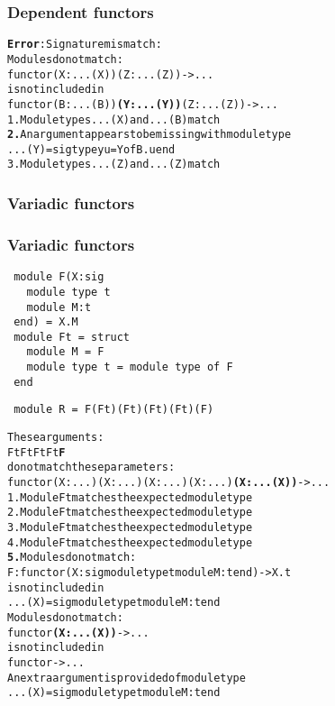 \documentclass[a4paper,11pt]{beamer}
\begin{document}
\begin{frame}[fragile]\frametitle{Dependent functors}
\begin{alltt}
{\bfseries{}\color{red}{}Error}: Signature mismatch:
       Modules do not match:
         functor {\color{green}{}(X : ...(X))} {\color{red}{}\bfseries{}} {\color{green}{}(Z : ...(Z))} -> ...
       is not included in
         functor {\color{green}{}(B : ...(B))} {\color{red}{}\bfseries{}(Y : ...(Y))} {\color{green}{}(Z : ...(Z))} -> ...
  {\color{green}{}1.} Module types ...(X) and ...(B) match
  {\color{red}{}\bfseries{}2.} An argument appears to be missing with module type
         ...(Y) = sig type yu = Y of B.u end
  {\color{green}{}3.} Module types ...(Z) and ...(Z) match
\end{alltt}
\end{frame}


\begin{frame}[fragile]\frametitle{Variadic functors}
\end{frame}

\begin{frame}[fragile]\frametitle{Variadic functors}
 \begin{verbatim}
 module F(X:sig
   module type t
   module M:t
 end) = X.M
 module Ft = struct
   module M = F
   module type t = module type of F
 end
\end{verbatim}
\end{frame}

\begin{frame}[fragile]
\begin{verbatim}
 module R = F(Ft)(Ft)(Ft)(Ft)(F)
\end{verbatim}
\begin{alltt}
     These arguments:
       {\color{green}{}Ft} {\color{green}{}Ft} {\color{green}{}Ft} {\color{green}{}Ft} {\color{magenta}{}\bfseries{}F}
     do not match these parameters:
       functor {\color{green}{}(X : ...)} {\color{green}{}(X : ...)} {\color{green}{}(X : ...)} {\color{green}{}(X : ...)} {\color{magenta}{}\bfseries{}(X : ...(X))} -> ...
{\color{green}{}1.} Module Ft matches the expected module type
{\color{green}{}2.} Module Ft matches the expected module type
{\color{green}{}3.} Module Ft matches the expected module type
{\color{green}{}4.} Module Ft matches the expected module type
{\color{magenta}{}\bfseries{}5.} Modules do not match:
     F : functor (X : sig module type t module M : t end) -> X.t
   is not included in
     ...(X) = sig module type t module M : t end
   Modules do not match:
     functor {\color{red}{}\bfseries{}(X : ...(X))} -> ...
   is not included in
     functor {\color{red}{}\bfseries{}} -> ...
      An extra argument is provided of module type
          ...(X) = sig module type t module M : t end

\end{alltt}
\end{frame}
\end{document}
